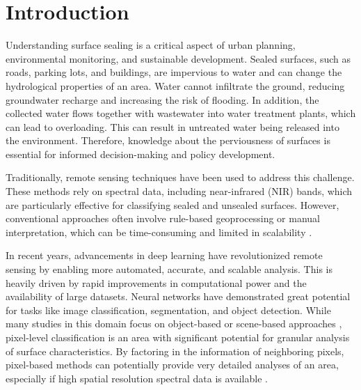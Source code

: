 

\section{Introduction}
\label{introduction}

Understanding surface sealing is a critical aspect of urban planning, environmental 
monitoring, and sustainable development. Sealed surfaces, such as roads, parking lots, 
and buildings, are impervious to water and can change the hydrological properties of
an area. Water cannot infiltrate the ground, reducing groundwater recharge and
increasing the risk of flooding. In addition, the collected water flows together with
wastewater into water treatment plants, which can lead to overloading. This
can result in untreated water being released into the environment. Therefore,
knowledge about the perviousness of surfaces is essential for informed decision-making
and policy development.

Traditionally, remote sensing techniques have been used to address this challenge. 
These methods rely on spectral data, including near-infrared (NIR) bands, which are 
particularly effective for classifying sealed and unsealed surfaces. 
However, conventional approaches often involve rule-based geoprocessing or manual interpretation, 
which can be time-consuming and limited in scalability \autocite{kadhimAdvancesRemoteSensing2016}.

In recent years, advancements in deep learning have revolutionized remote sensing by 
enabling more automated, accurate, and scalable analysis. This is heavily driven
by rapid improvements in computational power and the availability of large
datasets. Neural networks have demonstrated great potential for tasks like image classification,
segmentation, and object detection. While many studies in this domain focus on object-based or scene-based 
approaches \autocite{thapaDeepLearningRemote2023}, pixel-level classification is 
an area with significant potential for granular analysis of surface characteristics.
By factoring in the information of neighboring pixels, pixel-based methods can 
potentially provide very detailed analyses of an area, especially if high spatial
resolution spectral data is available \autocite{zhengHighSpatialResolution2023}.

